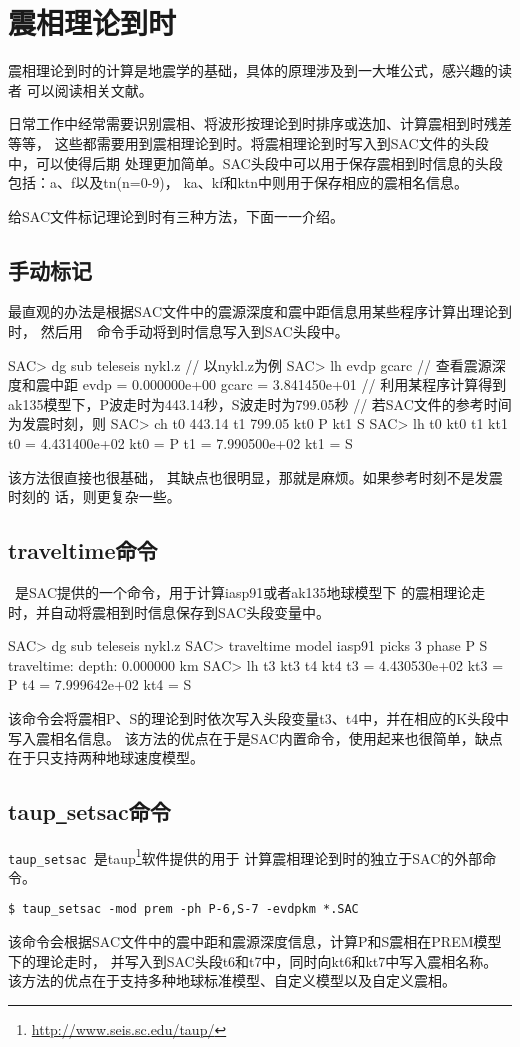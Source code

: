 \section{震相理论到时}
震相理论到时的计算是地震学的基础，具体的原理涉及到一大堆公式，感兴趣的读者
可以阅读相关文献。

日常工作中经常需要识别震相、将波形按理论到时排序或迭加、计算震相到时残差等等，
这些都需要用到震相理论到时。将震相理论到时写入到SAC文件的头段中，可以使得后期
处理更加简单。SAC头段中可以用于保存震相到时信息的头段包括：a、f以及tn(n=0-9)，
ka、kf和ktn中则用于保存相应的震相名信息。

给SAC文件标记理论到时有三种方法，下面一一介绍。

\subsection{手动标记}
最直观的办法是根据SAC文件中的震源深度和震中距信息用某些程序计算出理论到时，
然后用~~命令手动将到时信息写入到SAC头段中。
\begin{SACCode}
SAC> dg sub teleseis nykl.z     // 以nykl.z为例
SAC> lh evdp gcarc              // 查看震源深度和震中距
     evdp = 0.000000e+00
    gcarc = 3.841450e+01
// 利用某程序计算得到ak135模型下，P波走时为443.14秒，S波走时为799.05秒
// 若SAC文件的参考时间为发震时刻，则
SAC> ch t0 443.14 t1 799.05 kt0 P kt1 S
SAC> lh t0 kt0 t1 kt1
     t0 = 4.431400e+02
    kt0 = P
     t1 = 7.990500e+02
    kt1 = S
\end{SACCode}
该方法很直接也很基础， 其缺点也很明显，那就是麻烦。如果参考时刻不是发震时刻的
话，则更复杂一些。

\subsection{traveltime命令}
~是SAC提供的一个命令，用于计算iasp91或者ak135地球模型下
的震相理论走时，并自动将震相到时信息保存到SAC头段变量中。
\begin{SACCode}
SAC> dg sub teleseis nykl.z
SAC> traveltime model iasp91 picks 3 phase P S
traveltime: depth: 0.000000 km
SAC> lh t3 kt3 t4 kt4
         t3 = 4.430530e+02
        kt3 = P
         t4 = 7.999642e+02
        kt4 = S
\end{SACCode}
该命令会将震相P、S的理论到时依次写入头段变量t3、t4中，并在相应的K头段中写入震相名信息。
该方法的优点在于是SAC内置命令，使用起来也很简单，缺点在于只支持两种地球速度模型。

\subsection{taup\texttt{\_}setsac命令}
\verb+taup_setsac+~是taup\footnote{\url{http://www.seis.sc.edu/taup/}}软件提供的用于
计算震相理论到时的独立于SAC的外部命令。
\begin{verbatim}
$ taup_setsac -mod prem -ph P-6,S-7 -evdpkm *.SAC
\end{verbatim}
该命令会根据SAC文件中的震中距和震源深度信息，计算P和S震相在PREM模型下的理论走时，
并写入到SAC头段t6和t7中，同时向kt6和kt7中写入震相名称。
该方法的优点在于支持多种地球标准模型、自定义模型以及自定义震相。
